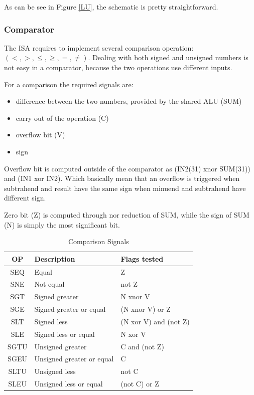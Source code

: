 \documentclass[12pt]{article}
\begin{document}
As can be see in Figure \ref{LU}, the schematic is pretty straightforward.


\subsubsection{Comparator}
The ISA requires to implement several comparison operation: $(<, >, \leq, \geq, =, \neq)$.
Dealing with both signed and unsigned numbers is not easy in a comparator, because the two operations use different inputs.

For a comparison the required signals are:
\begin{itemize}
	\item difference between the two numbers, provided by the shared ALU (SUM)
	\item carry out of the operation (C)
	\item overflow bit (V)
	\item sign
\end{itemize}
Overflow bit is computed outside of the comparator as (IN2(31) xnor SUM(31)) and (IN1 xor IN2).
Which basically mean that an overflow is triggered when subtrahend and result have the same sign when minuend and subtrahend have different sign.

Zero bit (Z) is computed through nor reduction of SUM, while the sign of SUM (N) is simply the most significant bit.
\begin{table}
\begin{center}
	\begin{tabular}{ | c | l | l |}
		\hline
		\rowcolor{LimeGreen} OP & Description & Flags tested \\ \hline
		SEQ & Equal & Z \\ \hline
		SNE & Not equal &  not Z \\ \hline
		SGT & Signed greater & N xnor V \\ \hline
		SGE & Signed greater or equal & (N  xnor  V) or Z \\ \hline
		SLT & Signed less & (N xor V) and (not Z)\\ \hline
		SLE & Signed less or equal & N xor V \\ \hline
		SGTU & Unsigned greater & C and (not Z) \\ \hline
		SGEU & Unsigned greater or equal & C \\ \hline
		SLTU & Unsigned less & not C \\ \hline
		SLEU & Unsigned less or equal & (not C) or Z  \\ \hline
	\end{tabular}
		\caption{Comparison Signals}
		\label{COMPA}
\end{center}
\end{table}
\end{document}
